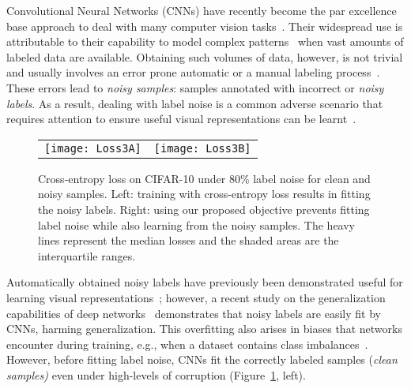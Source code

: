 \documentclass{article}
\providecommand{\tabularnewline}{\\}
\begin{document}
Convolutional Neural Networks (CNNs) have recently become the par
excellence base approach to deal with many computer vision tasks~\cite{2016_arXiv_Homography,2018_arXiv_descriptors,2018_CVPR_ImClassif,2016_CVPR_YOLO,2017_CVPR_PSPNet,2017_ICCV_EventCaptioning}.
Their widespread use is attributable to their capability to model
complex patterns~\cite{2018_ICML_L2ReweightNoise} when vast amounts
of labeled data are available. Obtaining such volumes of data, however,
is not trivial and usually involves an error prone automatic or a
manual labeling process~\cite{2018_ECCV_DevilNoiseFace,2018_CVPR_LabelNoiseSemSeg}.
These errors lead to \emph{noisy samples}: samples annotated
with incorrect or \emph{noisy labels}. As a result, dealing with label
noise is a common adverse scenario that requires attention to ensure
useful visual representations can be learnt~\cite{2018_ICML_MentorNet,2018_ECCV_DevilNoiseFace,2018_TIFS_NoiseFaceRecog,2018_TTGRS_NoisyLabelHyperIm,2018_CVPR_LabelNoiseSemSeg}.
\begin{figure}[t]
\begin{centering}
\vskip 0.2in 
\par\end{centering}
\centering{}\renewcommand\tabcolsep{1.25 pt} \begin{tabular}{cc}
\texttt{[image: Loss3A]} & \texttt{[image: Loss3B]}\tabularnewline
\end{tabular}\caption{\label{fig:Loss-during-training}Cross-entropy loss on CIFAR-10 under 80\% label noise for clean and noisy samples. Left: training with cross-entropy loss results in fitting the noisy labels. Right: using our proposed objective prevents fitting label noise while also learning from the noisy samples. The heavy lines represent the median losses and the shaded areas are the interquartile ranges.}
\vskip -0.2in 
\end{figure}
Automatically obtained noisy labels have previously been demonstrated
useful for learning visual representations~\cite{2017_CVPR_SelfSeg,2018_ICLR_Rotation};
however, a recent study on the generalization capabilities of deep
networks~\cite{2017_ICLR_Rethinking} demonstrates that noisy labels
are easily fit by CNNs, harming generalization. This overfitting also
arises in biases that networks encounter during training, e.g., when
a dataset contains class imbalances~\cite{2018_arxiv_BiasZisserman}.
However, before fitting label noise, CNNs fit the correctly labeled samples (\emph{clean samples)}
even under high-levels of corruption (Figure~\ref{fig:Loss-during-training}, left).
\end{document}
